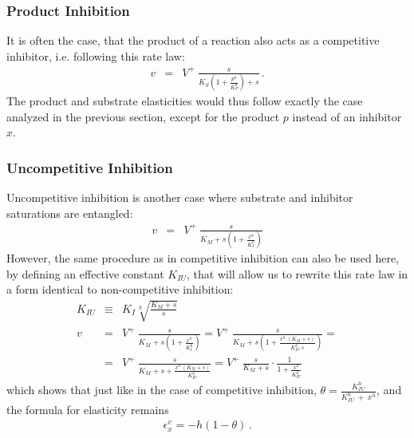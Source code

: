 \documentclass[12pt,a4paper]{article}
\begin{document}
\subsubsection{Product Inhibition}
It is often the case, that the product of a reaction also acts as a competitive inhibitor, i.e. following this rate law:
\begin{eqnarray}
v &=& V^+ ~ \frac{s}{K_S \left(1 + \frac{p^h}{K_P^h}\right) + s}\,.
\end{eqnarray}
The product and substrate elasticities would thus follow exactly the case analyzed in the previous section, except for the product $p$ instead of an inhibitor $x$.

\subsubsection{Uncompetitive Inhibition}
Uncompetitive inhibition is another case where substrate and inhibitor saturations are entangled:
\begin{eqnarray}
    v &=& V^+ ~ \frac{s}{K_M + s \left(1 + \frac{x^h}{K_I^h}\right)}
\end{eqnarray}
However, the same procedure as in competitive inhibition can also be used here, by defining an effective constant $K_{IU}$, that will allow us to rewrite this rate law in a form identical to non-competitive inhibition:
\begin{eqnarray}
    K_{IU} &\equiv& K_I \sqrt[h]{\frac{K_M + s}{s}} \nonumber\\
    v &=& V^+ ~ \frac{s}{K_M + s \left(1 + \frac{x^h}{K_I^h}\right)} =
          V^+ ~ \frac{s}{K_M + s \left(1 + \frac{x^h~(K_M + s)}{K_{IU}^h~s}\right)} = \nonumber\\
      &=& V^+ ~ \frac{s}{K_M + s + \frac{x^h~(K_M + s)}{K_{IU}^h}} = 
          V^+ ~ \frac{s}{K_M + s} \cdot \frac{1}{1 + \frac{x^h}{K_{IU}^h}}
\end{eqnarray}
which shows that just like in the case of competitive inhibition, $\theta = \frac{K_{IU}^h}{K_{IU}^h~+~x^h}$, and the formula for elasticity remains
\begin{eqnarray}
    \epsilon_x^v = -h(1 - \theta)\,. \label{eq:eps_uncomp_inh}
\end{eqnarray}
\end{document}
